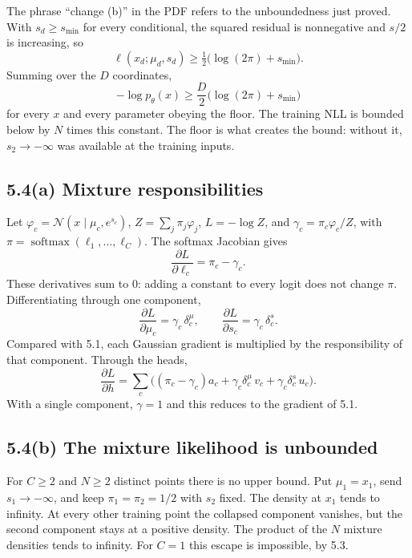 \documentclass[11pt]{article}
\theoremstyle{remark}
\newcommand{\N}{\mathcal{N}}
\DeclareMathOperator{\softmax}{softmax}
\begin{document}
The phrase ``change (b)'' in the PDF refers to the unboundedness just proved. With \(s_d\ge s_{\min}\) for every conditional, the squared residual is nonnegative and \(s/2\) is increasing, so
\[
\ell(x_d;\mu_d,s_d)\ge\tfrac12\big(\log(2\pi)+s_{\min}\big).
\]
Summing over the \(D\) coordinates,
\[
-\log p_\theta(x)\ge\frac D2\big(\log(2\pi)+s_{\min}\big)
\]
for every \(x\) and every parameter obeying the floor. The training NLL is bounded below by \(N\) times this constant. The floor is what creates the bound: without it, \(s_2\to-\infty\) was available at the training inputs.

\subsection*{5.4(a) Mixture responsibilities}

Let \(\varphi_c=\N(x\mid\mu_c,e^{s_c})\), \(Z=\sum_j\pi_j\varphi_j\), \(L=-\log Z\), and \(\gamma_c=\pi_c\varphi_c/Z\), with \(\pi=\softmax(\ell_1,\ldots,\ell_C)\). The softmax Jacobian gives
\[
\frac{\partial L}{\partial\ell_c}=\pi_c-\gamma_c.
\]
These derivatives sum to \(0\): adding a constant to every logit does not change \(\pi\). Differentiating through one component,
\[
\frac{\partial L}{\partial\mu_c}=\gamma_c\,\delta^\mu_c,\qquad
\frac{\partial L}{\partial s_c}=\gamma_c\,\delta^s_c.
\]
Compared with 5.1, each Gaussian gradient is multiplied by the responsibility of that component. Through the heads,
\[
\frac{\partial L}{\partial h}
=\sum_c\Big((\pi_c-\gamma_c)a_c+\gamma_c\delta^\mu_c\,v_c+\gamma_c\delta^s_c\,u_c\Big).
\]
With a single component, \(\gamma=1\) and this reduces to the gradient of 5.1.

\subsection*{5.4(b) The mixture likelihood is unbounded}

For \(C\ge 2\) and \(N\ge 2\) distinct points there is no upper bound. Put \(\mu_1=x_1\), send \(s_1\to-\infty\), and keep \(\pi_1=\pi_2=1/2\) with \(s_2\) fixed. The density at \(x_1\) tends to infinity. At every other training point the collapsed component vanishes, but the second component stays at a positive density. The product of the \(N\) mixture densities tends to infinity. For \(C=1\) this escape is impossible, by 5.3.
\end{document}
